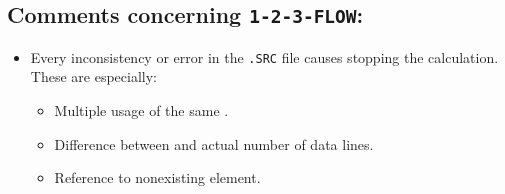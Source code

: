 \subsection*{Comments concerning {\tt 1-2-3-FLOW}:}
\begin{itemize}
  \item Every inconsistency or error in the {\tt .SRC} file causes stopping
    the calculation. These are especially:
    \begin{itemize}
      \item Multiple usage of the same .
      \item Difference between  and actual number
        of data lines.
      \item Reference to nonexisting element.
    \end{itemize}
\end{itemize}
